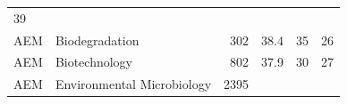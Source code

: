 \documentclass[11pt,]{article}
\begin{document}
\begin{longtable}[]{@{}llrrrr@{}}
\begin{minipage}[t]{0.11\columnwidth}
39\strut
\end{minipage}\tabularnewline
\begin{minipage}[t]{0.06\columnwidth}\raggedright\strut
AEM\strut
\end{minipage} & \begin{minipage}[t]{0.43\columnwidth}\raggedright\strut
Biodegradation\strut
\end{minipage} & \begin{minipage}[t]{0.04\columnwidth}\raggedleft\strut
302\strut
\end{minipage} & \begin{minipage}[t]{0.08\columnwidth}\raggedleft\strut
38.4\strut
\end{minipage} & \begin{minipage}[t]{0.11\columnwidth}\raggedleft\strut
35\strut
\end{minipage} & \begin{minipage}[t]{0.11\columnwidth}\raggedleft\strut
26\strut
\end{minipage}\tabularnewline
\begin{minipage}[t]{0.06\columnwidth}\raggedright\strut
AEM\strut
\end{minipage} & \begin{minipage}[t]{0.43\columnwidth}\raggedright\strut
Biotechnology\strut
\end{minipage} & \begin{minipage}[t]{0.04\columnwidth}\raggedleft\strut
802\strut
\end{minipage} & \begin{minipage}[t]{0.08\columnwidth}\raggedleft\strut
37.9\strut
\end{minipage} & \begin{minipage}[t]{0.11\columnwidth}\raggedleft\strut
30\strut
\end{minipage} & \begin{minipage}[t]{0.11\columnwidth}\raggedleft\strut
27\strut
\end{minipage}\tabularnewline
\begin{minipage}[t]{0.06\columnwidth}\raggedright\strut
AEM\strut
\end{minipage} & \begin{minipage}[t]{0.43\columnwidth}\raggedright\strut
Environmental Microbiology\strut
\end{minipage} & \begin{minipage}[t]{0.04\columnwidth}\raggedleft\strut
2395\strut
\end{minipage} & \begin{minipage}[t]{0.08\columnwidth}\raggedleft\strut

\end{minipage}
\end{longtable}
\end{document}

